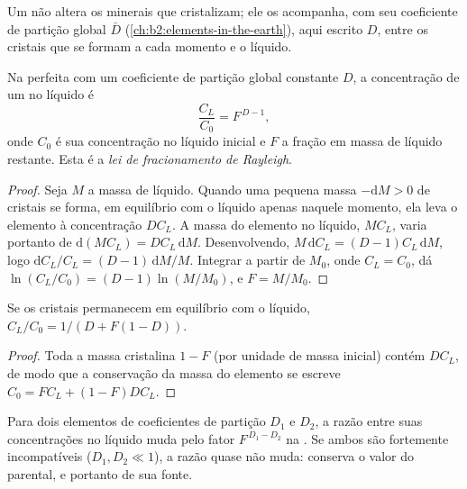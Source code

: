 Um  não altera os minerais que cristalizam; ele os acompanha,
com seu coeficiente de partição global $\bar D$ (\cref{ch:b2:elements-in-the-earth}),
aqui escrito $D$, entre os cristais que se formam a cada momento e o líquido.

\begin{theorem}\label{thm:b2:magmatic-differentiation:rayleigh}
Na  perfeita com um coeficiente de partição global constante
$D$, a concentração de um  no líquido é
\[
\frac{C_L}{C_0} = F^{\,D-1},
\]
onde $C_0$ é sua concentração no líquido inicial e $F$ a fração em massa de
líquido restante.
Esta é a \emph{lei de fracionamento de Rayleigh}.
\end{theorem}

\begin{proof}
Seja $M$ a massa de líquido. Quando uma pequena massa $-\mathrm dM > 0$ de cristais
se forma, em equilíbrio com o líquido apenas naquele momento, ela leva o elemento à
concentração $DC_L$. A massa do elemento no líquido, $MC_L$, varia portanto
de $\mathrm d(MC_L) = DC_L\,\mathrm dM$. Desenvolvendo, $M\,\mathrm dC_L = (D-1)C_L\,
\mathrm dM$, logo $\mathrm dC_L/C_L = (D-1)\,\mathrm dM/M$. Integrar a partir de $M_0$,
onde $C_L = C_0$, dá $\ln(C_L/C_0) = (D-1)\ln(M/M_0)$, e $F = M/M_0$.
\end{proof}

\begin{proposition}
\label{prop:b2:magmatic-differentiation:equilibrium}
Se os cristais permanecem em equilíbrio com o líquido, $C_L/C_0 = 1/(D + F(1-D))$.
\end{proposition}

\begin{proof}
Toda a massa cristalina $1-F$ (por unidade de massa inicial) contém $DC_L$, de modo que a conservação
da massa do elemento se escreve $C_0 = FC_L + (1-F)DC_L$.
\end{proof}

\begin{corollary}\label{cor:b2:magmatic-differentiation:ratio}
Para dois elementos de coeficientes de partição $D_1$ e $D_2$, a razão entre suas
concentrações no líquido muda pelo fator $F^{\,D_1-D_2}$ na . Se ambos são fortemente incompatíveis ($D_1, D_2 \ll 1$), a razão
quase não muda: conserva o valor do  parental, e portanto de sua fonte.
\end{corollary}

